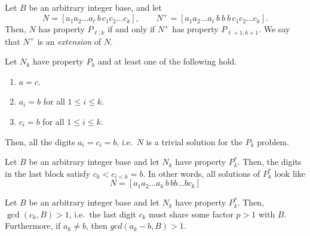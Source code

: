 \documentclass[10pt,a4paper]{amsart}
\begin{document}
\begin{proposition} \label{proposition:extension}
    Let $B$ be an arbitrary integer base, and let \[
        N = [a_1a_2\dots a_\ell \,b\, c_1c_2\dots c_k], \qquad
        N^+ = [a_1a_2\dots a_\ell \,b\: b\: b\, c_1c_2\dots c_k].
    \] Then, $N$ has property $P_{\ell; k}$ if and only if $N^+$ has property
    $P_{\ell + 1; k + 1}$. We say that $N^+$ is an \emph{extension} of $N$.
\end{proposition}

\begin{lemma} \label{lemma:trivial_2}
    Let $N_k$ have property $P_k$ and at least one of the following hold.
    \begin{enumerate}
        \item $a = c$.
        \item $a_i = b$ for all $1 \leq i \leq k$.
        \item $c_i = b$ for all $1 \leq i \leq k$.
    \end{enumerate}
    Then, all the digits $a_i = c_i = b$, i.e.\ $N$ is a trivial solution for 
    the $P_k$ problem.
\end{lemma}

\begin{lemma} \label{lemma:last_block}
    Let $B$ be an arbitrary integer base and let $N_k$ have property 
    $P^*_k$.
    Then, the digits in the last block satisfy $c_k < c_{i < k} = b$.
    In other words, all solutions of $P^*_k$ look like \[
        N = [a_1a_2\dots a_k \,b\, b b\dots b c_k]
    \]
\end{lemma}

\begin{lemma}\label{lemma:gcds}
    Let $B$ be an arbitrary integer base and let $N_k$ have property 
    $P^*_k$. Then, $\gcd(c_k, B) > 1$, i.e.\ the last digit $c_k$ must share some
    factor $p > 1$ with $B$.
    Furthermore, if $a_k \neq b$, then $gcd(a_k - b, B) > 1$.
\end{lemma}
\end{document}
